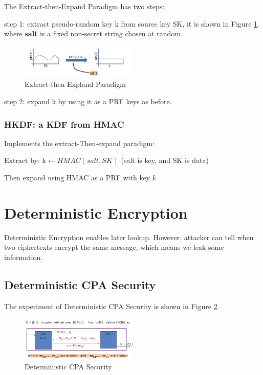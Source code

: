 The Extract-then-Expand Paradigm has two steps:

step 1: extract pseudo-random key k from source key SK, it is shown in Figure \ref{fig: 06 Extract-then-Expland Paradigm}. where \textbf{salt} is a fixed non-secret string chosen at random.

\begin{figure}[h]
    \centering
    \includegraphics[width=0.5\textwidth]{Stanford_Crypto_1/fig/06_Other_Thing/Extract-then-Expland Paradigm.png}
    \caption{Extract-then-Expland Paradigm}
    \label{fig: 06 Extract-then-Expland Paradigm}
\end{figure}


step 2: expand k by using it as a PRF keys as before.


\subsubsection{HKDF: a KDF from HMAC}

Implements the extract-Then-expand paradigm:

Extract by: $\mathrm{k} \leftarrow HMAC( salt, SK)$ (salt is key, and SK is data)

Then expand using HMAC as a PRF with key $k$


\section{Deterministic Encryption}

Deterministic Encryption enables later lookup. However, attacker can tell when two ciphertexts encrypt the same message, which means we leak some information.

\subsection{Deterministic CPA Security}

The experiment of Deterministic CPA Security is shown in Figure \ref{fig: 06 Deterministic CPA Security}.

\begin{figure}[h]
    \centering
    \includegraphics[width=0.5\textwidth]{Stanford_Crypto_1/fig/06_Other_Thing/Det CPA Security.png}
    \caption{Deterministic CPA Security}
    \label{fig: 06 Deterministic CPA Security}
\end{figure}

